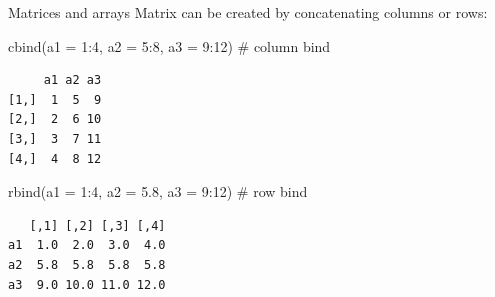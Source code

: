 \documentclass[
  ignorenonframetext,
]{beamer}
\newenvironment{Shaded}{\begin{snugshade}}{\end{snugshade}}
\newcommand{\AttributeTok}[1]{\textcolor[rgb]{0.00,0.34,0.68}{#1}}
\newcommand{\CommentTok}[1]{\textcolor[rgb]{0.54,0.53,0.53}{#1}}
\newcommand{\DecValTok}[1]{\textcolor[rgb]{0.69,0.50,0.00}{#1}}
\newcommand{\FloatTok}[1]{\textcolor[rgb]{0.69,0.50,0.00}{#1}}
\newcommand{\FunctionTok}[1]{\textcolor[rgb]{0.39,0.29,0.61}{#1}}
\newcommand{\NormalTok}[1]{\textcolor[rgb]{0.12,0.11,0.11}{#1}}
\newcommand{\SpecialCharTok}[1]{\textcolor[rgb]{0.24,0.68,0.91}{#1}}
\begin{document}
\begin{frame}[fragile]{Matrices and arrays}
\protect\hypertarget{matrices-and-arrays-1}{}
Matrix can be created by concatenating columns or rows:

\begin{Shaded}
\begin{Highlighting}[]
\FunctionTok{cbind}\NormalTok{(}\AttributeTok{a1 =} \DecValTok{1}\SpecialCharTok{:}\DecValTok{4}\NormalTok{, }\AttributeTok{a2 =} \DecValTok{5}\SpecialCharTok{:}\DecValTok{8}\NormalTok{, }\AttributeTok{a3 =} \DecValTok{9}\SpecialCharTok{:}\DecValTok{12}\NormalTok{) }\CommentTok{\# column bind}
\end{Highlighting}
\end{Shaded}

\begin{verbatim}
     a1 a2 a3
[1,]  1  5  9
[2,]  2  6 10
[3,]  3  7 11
[4,]  4  8 12
\end{verbatim}

\begin{Shaded}
\begin{Highlighting}[]
\FunctionTok{rbind}\NormalTok{(}\AttributeTok{a1 =} \DecValTok{1}\SpecialCharTok{:}\DecValTok{4}\NormalTok{, }\AttributeTok{a2 =} \FloatTok{5.8}\NormalTok{, }\AttributeTok{a3 =} \DecValTok{9}\SpecialCharTok{:}\DecValTok{12}\NormalTok{) }\CommentTok{\# row bind}
\end{Highlighting}
\end{Shaded}

\begin{verbatim}
   [,1] [,2] [,3] [,4]
a1  1.0  2.0  3.0  4.0
a2  5.8  5.8  5.8  5.8
a3  9.0 10.0 11.0 12.0
\end{verbatim}
\end{frame}
\end{document}

